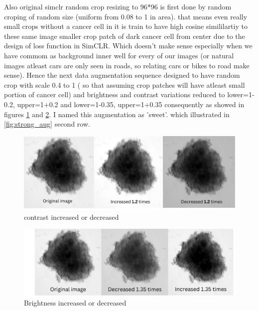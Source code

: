Also original simclr random crop resizing to 96*96 is first done by random croping of random size (uniform from 0.08 to 1 in area). that means even really small 
crops without a cancer cell in it is train to have high cosine simililartiy to these same image smaller crop patch of dark cancer cell from center due to the design
 of  loss function in SimCLR. Which doesn't make sense especially when we have commom as background inner well for every of our images (or natural images atleast cars are only seen in roads, so 
 relating cars or bikes to road make sense). Hence the next data augmentation sequence designed to have random crop with scale 0.4 to 1 ( so that 
 assuming crop patches will have atleast small portion of cancer cell) and brightness and contrast variations reduced to lower=1-0.2, upper=1+0.2 and lower=1-0.35,
  upper=1+0.35 consequently as showed in figures  \ref{fig:bright} and  \ref{fig:contra}. I named this augmentation as 'sweet'. which illustrated in \ref{fig:strong_aug} second row.

  \begin{figure}[H]
    \centering
    \includegraphics[scale=0.4]{figures/bright.png} 
    \caption{contrast increased or decreased}
    \label{fig:bright}
  \end{figure}

  \begin{figure}[H]
    \centering
    \includegraphics[scale=0.5]{figures/contra.png} 
    \caption{Brightness increased or decreased}
    \label{fig:contra}
  \end{figure}

